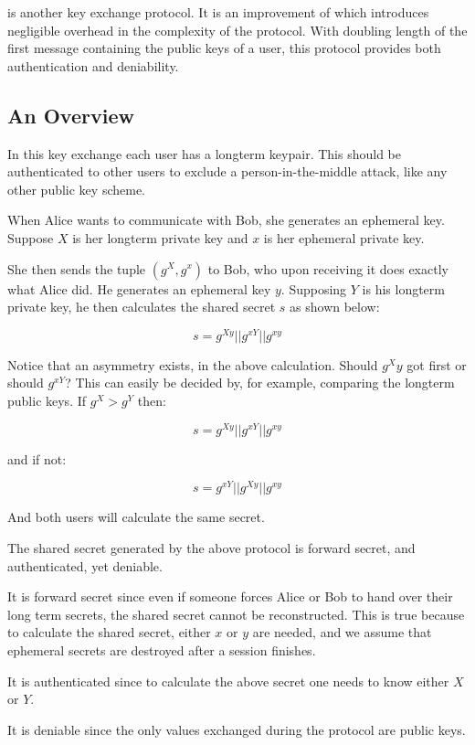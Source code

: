 \tdhname is another key exchange protocol.
It is an improvement of \dhname which introduces negligible overhead in the complexity of the protocol.
With doubling length of the first message containing the public keys of a user, this protocol provides both authentication and deniability.

\subsection{An Overview}

In this key exchange each user has a \dhname longterm keypair.
This should be authenticated to other users to exclude a person-in-the-middle attack, like any other public key scheme.

When Alice wants to communicate with Bob, she generates an ephemeral \dhname key.
Suppose $X$ is her longterm private key and $x$ is her ephemeral private key.

She then sends the tuple $(g^X, g^x)$ to Bob, who upon receiving it does exactly what Alice did. He generates an ephemeral key $y$. Supposing $Y$ is his longterm private key, he then calculates the shared secret $s$ as shown below:

\[
  s = g^{Xy} || g^{xY} || g^{xy}
\]

Notice that an asymmetry exists, in the above calculation.
Should $g^Xy$ got first or should $g^{xY}$?
This can easily be decided by, for example, comparing the longterm public keys.
If $g^X > g^Y$ then:

\[
  s = g^{Xy} || g^{xY} || g^{xy}
\]

and if not:

\[
  s = g^{xY}|| g^{Xy} || g^{xy}
\]

And both users will calculate the same secret.

The shared secret generated by the above protocol is forward secret, and authenticated, yet deniable.

It is forward secret since even if someone forces Alice or Bob to hand over their long term secrets, the shared secret cannot be reconstructed.
This is true because to calculate the shared secret, either $x$ or $y$ are needed, and we assume that ephemeral secrets are destroyed after a session finishes.

It is authenticated since to calculate the above secret one needs to know either $X$ or $Y$.

It is deniable since the only values exchanged during the protocol are public keys.

